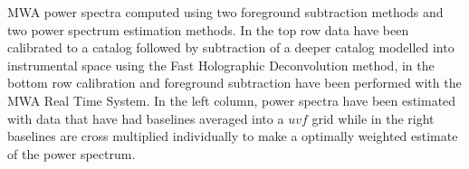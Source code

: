 MWA power spectra computed using two foreground subtraction methods and two power spectrum estimation methods.  In the top row data have been calibrated to a catalog followed by subtraction of a deeper catalog modelled into instrumental space using the Fast Holographic Deconvolution method, in the bottom row calibration and foreground subtraction have been performed with the MWA Real Time System.  In the left column, power spectra have been estimated with data that have had baselines averaged into a $uvf$ grid while in the right baselines are cross multiplied individually to make a optimally weighted estimate of the power spectrum.